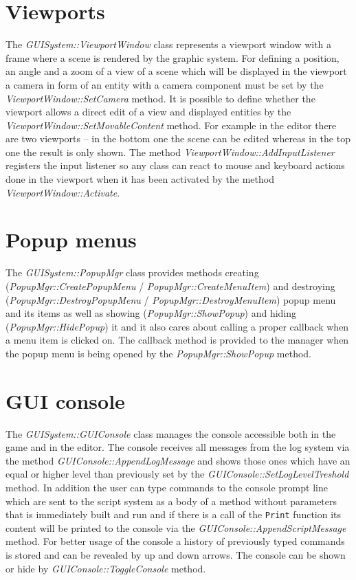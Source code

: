 \documentclass[a4paper, 12pt]{report}
\begin{document}
\section{Viewports}

The \emph{GUISystem::ViewportWindow} class represents a viewport window with a frame where a scene is rendered by the graphic system. For defining a position, an angle and a zoom of a view of a scene which will be displayed in the viewport a camera in form of an entity with a camera component must be set by the \emph{ViewportWindow::SetCamera} method. It is possible to define whether the viewport allows a direct edit of a view and displayed entities by the \emph{ViewportWindow::SetMovableContent} method. For example in the editor there are two viewports -- in the bottom one the scene can be edited whereas in the top one the result is only shown. The method \emph{ViewportWindow::AddInputListener} registers the input listener so any class can react to mouse and keyboard actions done in the viewport when it has been activated by the method \emph{ViewportWindow::Activate}.

\section{Popup menus}

The \emph{GUISystem::PopupMgr} class provides methods creating (\emph{Popup\-Mgr\-::\-Create\-Popup\-Menu} / \emph{PopupMgr::CreateMenuItem}) and destroying (\emph{PopupMgr::DestroyPopupMenu} / \emph{PopupMgr::DestroyMenuItem}) popup menu and its items as well as showing (\emph{PopupMgr::ShowPopup}) and hiding (\emph{PopupMgr::HidePopup}) it and it also cares about calling a proper callback when a menu item is clicked on. The callback method is provided to the manager when the popup menu is being opened by the \emph{PopupMgr::ShowPopup} method.

\section{GUI console}
\label{sec:gui-console}

The \emph{GUISystem::GUIConsole} class manages the console accessible both in the game and in the editor. The console receives all messages from the log system via the method \emph{GUIConsole::AppendLogMessage} and shows those ones which have an equal or higher level than previously set by the \emph{GUIConsole::SetLogLevelTreshold} method. In addition the user can type commands to the console prompt line which are sent to the script system as a body of a method without parameters that is immediately built and run and if there is a call of the \verb/Print/ function its content will be printed to the console via the \emph{GUIConsole::AppendScriptMessage} method. For better usage of the console a history of previously typed commands is stored and can be revealed by up and down arrows. The console can be shown or hide by \emph{GUIConsole::ToggleConsole} method.
\end{document}
